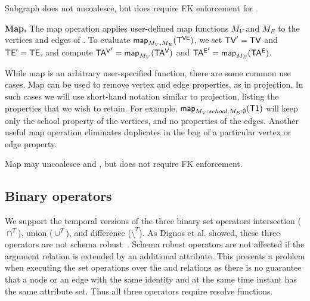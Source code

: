 Subgraph does not uncoalesce, but does require FK enforcement for \tve.


{\bf Map.}  The map operation applies user-defined map functions $M_V$
and $M_E$ to the vertices and edges of \tg.  To evaluate
$\textsf{map}_{M_V,M_E} (\mathsf{T^{VE}})$, we set $\textsf{TV}'=\textsf{TV}$ and $\textsf{TE}'=\textsf{TE}$, and compute
$\mathsf{TA^{V}}' = \textsf{map}_{M_V}(\mathsf{TA^{V}})$ and $\mathsf{TA^{E}}' = \textsf{map}_{M_E}(\mathsf{TA^{E}})$.


While map is an arbitrary user-specified function, there are some
common use cases.  Map can be used to remove vertex and edge
properties, as in projection.  In such cases we will use short-hand
notation similar to projection, listing the properties that we wish to
retain. For example, $\textsf{map}_{M_V:{school},M_E:\emptyset} (\textsf{T1})$
will keep only the school property of the vertices, and no properties
of the edges.  Another useful map operation eliminates duplicates in
the bag of a particular vertex or edge property.  

Map may uncoalesce \tav and \tae, but does not require FK enforcement.

\subsection{Binary operators}
\label{sec:algebra:binary}

We support the temporal versions of the three binary set operators
intersection ($\cap^T$), union ($\cup^T$), and difference
($\setminus^T$).  As Dignos et al. showed, these three operators are
not schema robust~\cite{Dignos2012}.  Schema robust operators are not
affected if the argument relation is extended by an additional
attribute.  This presents a problem when executing the set operations
over the \tav and \tae relations as there is no guarantee that a node
or an edge with the same identity and at the same time instant has the
same attribute set.  Thus all three operators require resolve
functions.

